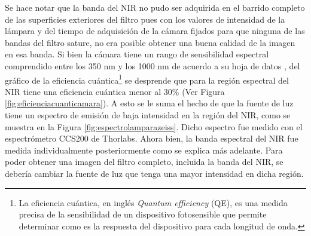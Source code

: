 Se hace notar que la banda del NIR no pudo ser adquirida en el barrido completo de las superficies exteriores del filtro pues con los valores de intensidad de la lámpara y del tiempo de adquisición de la cámara fijados para que ninguna de las bandas del filtro sature, no era posible obtener una buena calidad de la imagen en esa banda. Si bien la cámara tiene un rango de sensibilidad espectral comprendido entre los 350 nm y los 1000 nm de acuerdo a su hoja de datos \cite{Zeiss}, del gráfico de la eficiencia cuántica\footnote{La eficiencia cuántica, en inglés \textit{Quantum efficiency} (QE), es una medida precisa de la sensibilidad de un dispositivo fotosensible que permite determinar como es la respuesta del dispositivo para cada longitud de onda.} se desprende que para la región espectral del NIR tiene una eficiencia cuántica menor al 30\% (Ver Figura \ref{fig:eficienciacuanticamara}). A esto se le suma el hecho de que la fuente de luz tiene un espectro de emisión de baja intensidad en la región del NIR, como se muestra en la Figura \ref{fig:espectrolamparazeiss}. Dicho espectro fue medido con el espectrómetro CCS200 de Thorlabs. Ahora bien, la banda espectral del NIR fue medida individualmente posteriormente como se explica más adelante.
Para poder obtener una imagen del filtro completo, incluida la banda del NIR, se debería cambiar la fuente de luz que tenga una mayor intensidad en dicha región.


